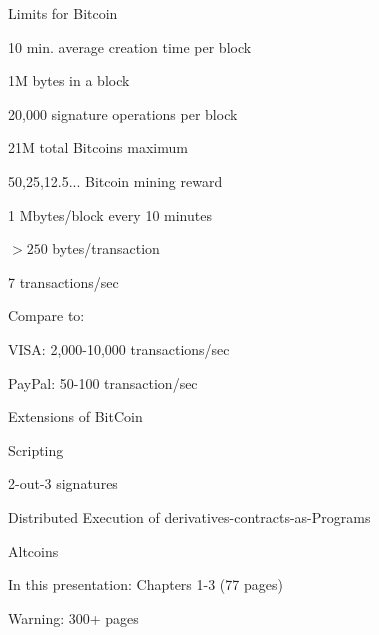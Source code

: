 \begin{frame}{Limits for Bitcoin}


\BI
\item 10 min. average creation time per block
\item 1M bytes in a block
\item 20,000 signature operations per block
\item 21M total Bitcoins maximum
\item 50,25,12.5... Bitcoin mining reward
\EI


\BI
\item 1 Mbytes/block every 10 minutes
\item $>250$ bytes/transaction
\item 7 transactions/sec 
\item Compare to:
	\BI
	\item VISA: 2,000-10,000 transactions/sec
	\item PayPal: 50-100 transaction/sec
	\EI
\EI
\end{frame}

\begin{frame}{Extensions of BitCoin}


\BIL
\item Scripting
	\BI
	\item 2-out-3 signatures
	\EI
\item Distributed Execution of derivatives-contracts-as-Programs
\item Altcoins
\EIL
\end{frame}



\begin{RMFrame}

\BI
\item {}
\item In this presentation: Chapters 1-3 (77 pages)
\item Warning: 300+ pages
\EI

\end{RMFrame}







